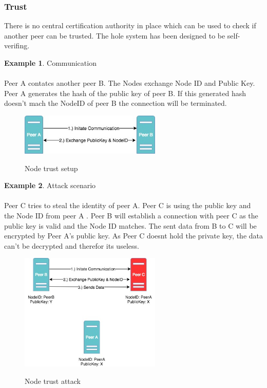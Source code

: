 \documentclass[a4paper,11pt, oneside]{report}
\theoremstyle{definition}
\newtheorem{exmp}{Example}[subsection]
\begin{document}
\subsubsection{Trust}
There is no central certification authority in place which can be used to check if another peer can be trusted. The hole system has been designed to be self-verifing.\\[0.3cm]
\begin{exmp} Communication\\ \\
Peer A contatcs another peer B. The Nodes exchange Node ID and Public Key.
Peer A generates the hash of the public key of peer B. If this generated hash doesn't mach the NodeID of peer B the connection will be terminated.\\[0.3cm]
\begin{figure}[H]
\centering
\includegraphics[width=0.6\textwidth]{img/ipfs_peertrust_scenario_init.jpg}\\[0.8cm]
\caption[Node trust]{Node trust setup}
\end{figure}
\end{exmp}
\newpage
\begin{exmp}  Attack scenario\\ \\
Peer C tries to steal the identity of peer A. Peer C is using the public key and the Node ID from peer A . Peer B will establish a connection with peer C as the public key is valid and the Node ID matches. The sent data from B to C will be encrypted by Peer A's public key. As Peer C doesnt hold the private key, the data can't be decrypted and therefor its useless.
\begin{figure}[H]
\centering
\includegraphics[width=0.6\textwidth]{img/ipfs_peertrust_scenario_attack.jpg}\\[0.8cm]
\caption[Node trust attack]{Node trust attack}
\end{figure}
\end{exmp}
\end{document}
